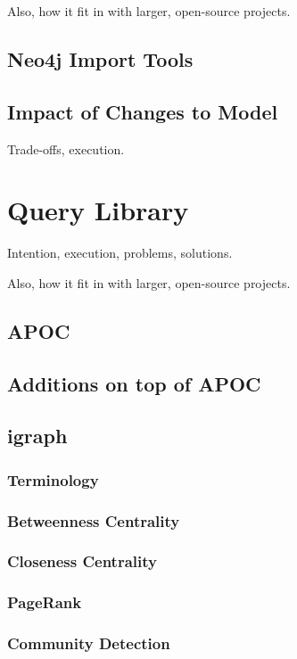 Also, how it fit in with larger, open-source projects.

\subsection{Neo4j Import Tools}

\subsection{Impact of Changes to Model}
Trade-offs, execution.

\section{Query Library}
Intention, execution, problems, solutions.

Also, how it fit in with larger, open-source projects.

\subsection{APOC}

\subsection{Additions on top of APOC}

\subsection{igraph}

\subsubsection{Terminology}

\subsubsection{Betweenness Centrality}

\subsubsection{Closeness Centrality}

\subsubsection{PageRank}

\subsubsection{Community Detection}

